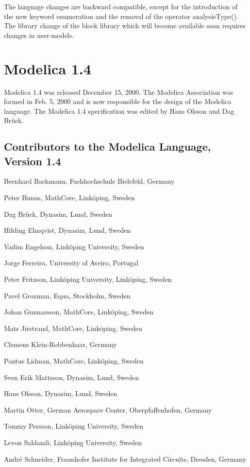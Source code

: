 \documentclass[10pt,a4paper]{report}
\def\doublelabel#1{\label{#1}}
\begin{document}
The language changes are backward compatible, except for the
introduction of the new keyword enumeration and the removal of the
operator analysisType(). The library change of the block library which
will become available soon requires changes in user-models.

\section{Modelica 1.4}\doublelabel{modelica-1-4}

Modelica 1.4 was released December 15, 2000. The Modelica Association
was formed in Feb. 5, 2000 and is now responsible for the design of the
Modelica language. The Modelica 1.4 specification was edited by Hans
Olsson and Dag Brück.

\subsection{Contributors to the Modelica Language, Version 1.4}\doublelabel{contributors-to-the-modelica-language-version-1-4}
\indent\indent
Bernhard Bachmann, Fachhochschule Bielefeld, Germany

Peter Bunus, MathCore, Linköping, Sweden

Dag Brück, Dynasim, Lund, Sweden

Hilding Elmqvist, Dynasim, Lund, Sweden

Vadim Engelson, Linköping University, Sweden

Jorge Ferreira, University of Aveiro, Portugal

Peter Fritzson, Linköping University, Linköping, Sweden

Pavel Grozman, Equa, Stockholm, Sweden

Johan Gunnarsson, MathCore, Linköping, Sweden

Mats Jirstrand, MathCore, Linköping, Sweden

Clemens Klein-Robbenhaar, Germany

Pontus Lidman, MathCore, Linköping, Sweden

Sven Erik Mattsson, Dynasim, Lund, Sweden

Hans Olsson, Dynasim, Lund, Sweden

Martin Otter, German Aerospace Center, Oberpfaffenhofen, Germany

Tommy Persson, Linköping University, Sweden

Levon Saldamli, Linköping University, Sweden

André Schneider, Fraunhofer Institute for Integrated Circuits, Dresden,
Germany
\end{document}
